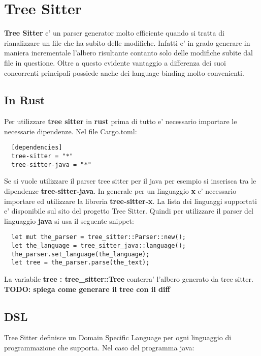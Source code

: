 \chapter{Tree Sitter}

\textbf{Tree Sitter} e' un parser generator molto efficiente quando si tratta di rianalizzare un file che ha subito delle modifiche. Infatti e' in grado generare in maniera incrementale l'albero risultante contanto solo delle modifiche subite dal file in questione.
Oltre a questo evidente vantaggio a differenza dei suoi concorrenti principali possiede anche dei language binding molto convenienti.

\section{In Rust}

Per utilizzare \textbf{tree sitter} in \textbf{rust} prima di tutto e' necessario importare le necessarie dipendenze. Nel file Cargo.toml:

\begin{verbatim}
  [dependencies]
  tree-sitter = "*"
  tree-sitter-java = "*"
\end{verbatim}

Se si vuole utilizzare il parser tree sitter per il java per esempio si inserisca tra le dipendenze \textbf{tree-sitter-java}. In generale per un linguaggio \textbf{x} e' necessario importare ed utilizzare la libreria \textbf{tree-sitter-x}. La lista dei linguaggi supportati e' disponibile sul sito del progetto Tree Sitter.
Quindi per utilizzare il parser del linguaggio \textbf{java} si usa il seguente snippet:

\begin{verbatim}
  let mut the_parser = tree_sitter::Parser::new();
  let the_language = tree_sitter_java::language();
  the_parser.set_language(the_language);
  let tree = the_parser.parse(the_text);
\end{verbatim}

La variabile \textbf{tree : tree\_sitter::Tree} conterra' l'albero generato da tree sitter.
\textbf{TODO: spiega come generare il tree con il diff}

\section{DSL}

Tree Sitter definisce un Domain Specific Language per ogni linguaggio di programmazione che supporta. Nel caso del programma java:

